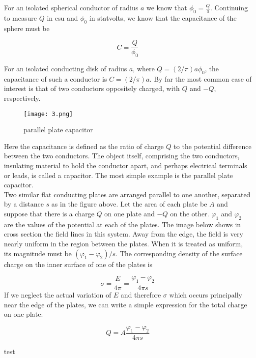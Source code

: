 \documentclass[svgnames]{article}
\begin{document}
For an isolated spherical conductor of radius $a$ we know that $\phi_0
= \frac{Q}{a}$. Continuing to measure $Q$ in esu and $\phi_0$ in statvolts, we
know that the capacitance of the sphere must be \\
\begin{tcolorbox}
\[
C = \frac{Q}{\phi_0}
\] 
\end{tcolorbox}


For an isolated conducting disk of radius $a$, where $Q = (2/\pi)a\phi_0$, the
capacitance of such a conductor is $C = (2/\pi)a$. By far the most common case
of interest is that of two conductors oppositely charged, with $Q$ and $-Q$,
respectively. 

\begin{figure}[hb!]
  \centering
    \texttt{[image: 3.png]}
    \caption{parallel plate capacitor}
\end{figure}

Here the capacitance is defined as the ratio of charge $Q$ to the potential
difference between the two conductors. The object itself, comprising the two
conductors, insulating material to hold the conductor apart, and perhaps
electrical terminals or leads, is called a capacitor. The most simple example
is the parallel plate capacitor. \\
Two similar flat conducting plates are arranged parallel to one another,
separated by a distance $s$ as in the figure above. Let the area of each plate
be $A$ and suppose that there is a charge $Q$ on one plate and $-Q$ on the
other. $\varphi_1$ and $\varphi_2$ are the values of the potential at each of
the plates. The image below shows in cross section the field lines in this
system. Away from the edge, the field is very nearly uniform in the region
between the plates. When it is treated as uniform, its magnitude must be
$(\varphi_1 - \varphi_2)/s$. The corresponding density of the surface charge on
the inner surface of one of the plates is 

\[
  \sigma = \frac{E}{4\pi} = \frac{\varphi_1-\varphi_2}{4\pi s}
\] 
If we neglect the actual variation of $E$ and therefore $\sigma$ which occurs
principally near the edge of the plates, we can write a simple expression for
the total charge on one plate: 

 \[
Q = A\frac{\varphi_1-\varphi_2}{4\pi s}
\] 

test
\end{document}
